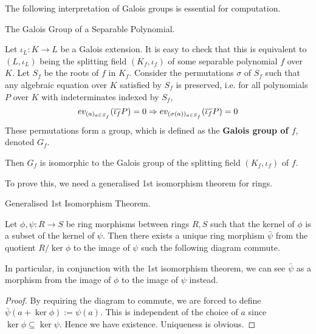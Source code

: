 \documentclass[../book.tex]{subfiles}
\begin{document}

The following interpretation of Galois groups is essential for computation. 

\begin{thm} The Galois Group of a Separable Polynomial. 
    
    Let $\iota_L : K \to L$ be a Galois extension. 
    It is easy to check that this is equivalent to $(L,\iota_L)$ being
    the splitting field $(K_f,\iota_f)$ of some separable polynomial $f$ over $K$.
    Let $S_f$ be the roots of $f$ in $K_f$. 
    Consider the permutations $\sigma$ of $S_f$ such that 
    any algebraic equation over $K$ satisfied by $S_f$ is preserved, 
    i.e. for all polynomials $P$ over $K$ with indeterminates indexed by $S_f$,
    \[
        ev_{(a)_{a\in S_f}} (\overline{\iota_f} P) = 0 
        \Rightarrow ev_{(\sigma(a))_{a\in S_f}} (\overline{\iota_f} P) = 0
    \]
    These permutations form a group,
    which is defined as the \textbf{Galois group of $f$}, denoted $G_f$.
    
    Then $G_f$ is isomorphic to the Galois group 
    of the splitting field $(K_f,\iota_f)$ of $f$. 
    
\end{thm}

To prove this, we need a generalised 1st isomorphism theorem for rings. 

\begin{lem} Generalised 1st Isomorphism Theorem. 
    
    Let $\phi, \psi : R \to S$ be ring morphisms between rings $R, S$ such that
    the kernel of $\phi$ is a subset of the kernel of $\psi$. 
    Then there exists a unique ring morphism $\bar{\psi}$ 
    from the quotient $R / \ker\phi$ to the image of $\psi$
    such the following diagram commute. \begin{figure}[H]
        \centering
    \end{figure}
    In particular, in conjunction with the 1st isomorphism theorem,
    we can see $\bar{\psi}$ as a morphism from 
    the image of $\phi$ to the image of $\psi$ instead. 
    
\end{lem}
\begin{proof}
    
    By requiring the diagram to commute, 
    we are forced to define $\bar{\psi}(a + \ker\phi) := \psi(a)$.
    This is independent of the choice of $a$ since $\ker\phi \subseteq \ker\psi$. 
    Hence we have existence. 
    Uniqueness is obvious. 
\end{proof}
\end{document}
